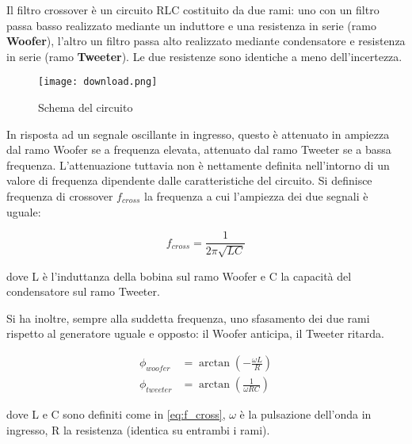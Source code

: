 \documentclass[../Relazione_circuiti]{subfiles}
\begin{document}
Il filtro crossover è un circuito RLC costituito da due rami: uno con un filtro passa basso realizzato mediante un
induttore e una resistenza in serie (ramo \textbf{Woofer}), l'altro un filtro passa alto realizzato mediante
condensatore e resistenza in serie (ramo \textbf{Tweeter}). Le due resistenze sono identiche a meno dell'incertezza.

\begin{figure}[H]
  \centering
  \texttt{[image: download.png]}

  \caption{Schema del circuito}
  \label{fig:schema_circuito}

\end{figure}

In risposta ad un segnale oscillante in ingresso, questo è attenuato in ampiezza dal ramo Woofer se a frequenza elevata,
attenuato dal ramo Tweeter se a bassa frequenza. L'attenuazione tuttavia non è nettamente definita nell'intorno di un
valore di frequenza dipendente dalle caratteristiche del circuito. Si definisce frequenza di crossover $f_{cross}$ la
frequenza a cui l'ampiezza dei due segnali è uguale:

\begin{equation}\label{eq:f_cross}
  f_{cross} = \frac{1}{2 \pi \sqrt{LC} }
\end{equation}

dove L è l'induttanza della bobina sul ramo Woofer e C la capacità del condensatore sul ramo Tweeter.

Si ha inoltre, sempre alla suddetta frequenza, uno sfasamento dei due rami rispetto al generatore uguale e opposto: il
Woofer anticipa, il Tweeter ritarda.

\begin{align}
  \phi_{woofer} &= \arctan(-\frac{\omega L}{R}) \label{eq:p_woofer} \\
  \phi_{tweeter} &= \arctan(\frac{1}{\omega RC}) \label{eq:p_tweeter}
\end{align}


dove L e C sono definiti come in \eqref{eq:f_cross}, $\omega$ è la pulsazione dell'onda in ingresso, R la resistenza
(identica su entrambi i rami).
\end{document}
